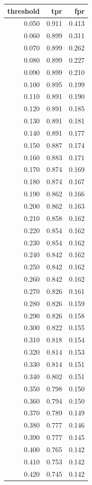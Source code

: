 \begin{tabular}{rrr}
\toprule
threshold & tpr & fpr \\
\midrule
0.050 & 0.911 & 0.413 \\
0.060 & 0.899 & 0.311 \\
0.070 & 0.899 & 0.262 \\
0.080 & 0.899 & 0.227 \\
0.090 & 0.899 & 0.210 \\
0.100 & 0.895 & 0.199 \\
0.110 & 0.891 & 0.190 \\
0.120 & 0.891 & 0.185 \\
0.130 & 0.891 & 0.181 \\
0.140 & 0.891 & 0.177 \\
0.150 & 0.887 & 0.174 \\
0.160 & 0.883 & 0.171 \\
0.170 & 0.874 & 0.169 \\
0.180 & 0.874 & 0.167 \\
0.190 & 0.862 & 0.166 \\
0.200 & 0.862 & 0.163 \\
0.210 & 0.858 & 0.162 \\
0.220 & 0.854 & 0.162 \\
0.230 & 0.854 & 0.162 \\
0.240 & 0.842 & 0.162 \\
0.250 & 0.842 & 0.162 \\
0.260 & 0.842 & 0.162 \\
0.270 & 0.826 & 0.161 \\
0.280 & 0.826 & 0.159 \\
0.290 & 0.826 & 0.158 \\
0.300 & 0.822 & 0.155 \\
0.310 & 0.818 & 0.154 \\
0.320 & 0.814 & 0.153 \\
0.330 & 0.814 & 0.151 \\
0.340 & 0.802 & 0.151 \\
0.350 & 0.798 & 0.150 \\
0.360 & 0.794 & 0.150 \\
0.370 & 0.789 & 0.149 \\
0.380 & 0.777 & 0.146 \\
0.390 & 0.777 & 0.145 \\
0.400 & 0.765 & 0.142 \\
0.410 & 0.753 & 0.142 \\
0.420 & 0.745 & 0.142 \\

\end{tabular}
